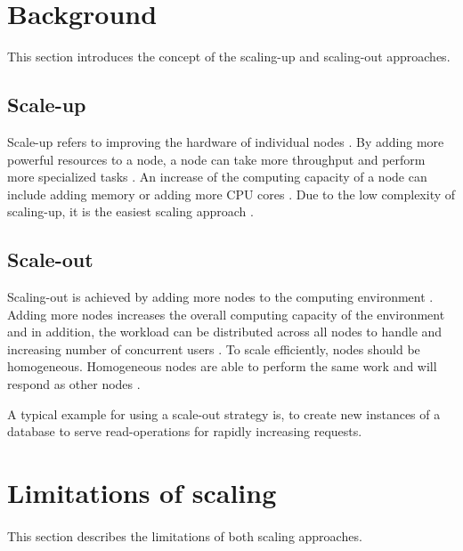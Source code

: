 \documentclass{article}
\begin{document}
\section{Background}

This section introduces the concept of the scaling-up and scaling-out approaches.

\subsection{Scale-up}
Scale-up refers to improving the hardware of individual nodes \cite{Wilder2012CloudPatterns}. By adding more powerful resources to a node, a node can take more throughput and perform more specialized tasks \cite{Abbott2015ScalabilityArt}.
An increase of the computing capacity of a node can include adding memory or adding more CPU cores \cite{Wilder2012CloudPatterns}.
Due to the low complexity of scaling-up, it is the easiest scaling approach \cite{Wilder2012CloudPatterns}.


\subsection{Scale-out}
Scaling-out is achieved by adding more nodes to the computing environment \cite{Wilder2012CloudPatterns}. Adding more nodes increases the overall computing capacity of the environment and in addition, the workload can be distributed across all nodes to handle and increasing number of concurrent users \cite{Wilder2012CloudPatterns, Abbott2015ScalabilityArt}.
To scale efficiently, nodes should be homogeneous. Homogeneous nodes are able to perform the same work and will respond as other nodes \cite{Abbott2015ScalabilityArt}.


A typical example for using a scale-out strategy is, to create new instances of a database to serve read-operations for rapidly increasing requests.


\section{Limitations of scaling}
\paragraph{}
This section describes the limitations of both scaling approaches.
\end{document}
